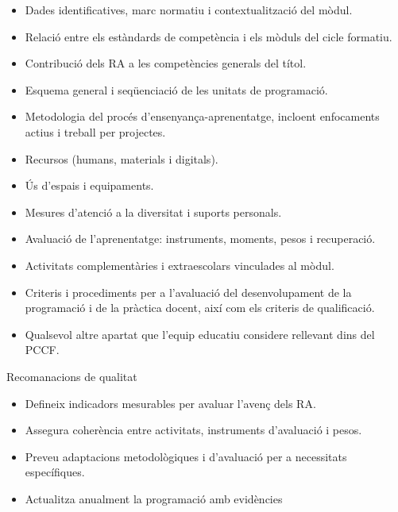 \documentclass[
  paper=a4,
  ,captions=tableheading
]{scrartcl}
\providecommand{\tightlist}{%
  \setlength{\itemsep}{0pt}\setlength{\parskip}{0pt}}
\begin{document}
\begin{itemize}
\tightlist
\item
  Dades identificatives, marc normatiu i contextualització del mòdul.
\item
  Relació entre els estàndards de competència i els mòduls del cicle
  formatiu.
\item
  Contribució dels RA a les competències generals del títol.
\item
  Esquema general i seqüenciació de les unitats de programació.
\item
  Metodologia del procés d'ensenyança-aprenentatge, incloent enfocaments
  actius i treball per projectes.
\item
  Recursos (humans, materials i digitals).
\item
  Ús d'espais i equipaments.
\item
  Mesures d'atenció a la diversitat i suports personals.
\item
  Avaluació de l'aprenentatge: instruments, moments, pesos i
  recuperació.
\item
  Activitats complementàries i extraescolars vinculades al mòdul.
\item
  Criteris i procediments per a l'avaluació del desenvolupament de la
  programació i de la pràctica docent, així com els criteris de
  qualificació.
\item
  Qualsevol altre apartat que l'equip educatiu considere rellevant dins
  del PCCF.
\end{itemize}

Recomanacions de qualitat

\begin{itemize}
\tightlist
\item
  Defineix indicadors mesurables per avaluar l'avenç dels RA.
\item
  Assegura coherència entre activitats, instruments d'avaluació i pesos.
\item
  Preveu adaptacions metodològiques i d'avaluació per a necessitats
  específiques.
\item
  Actualitza anualment la programació amb evidències
\end{itemize}
\end{document}
